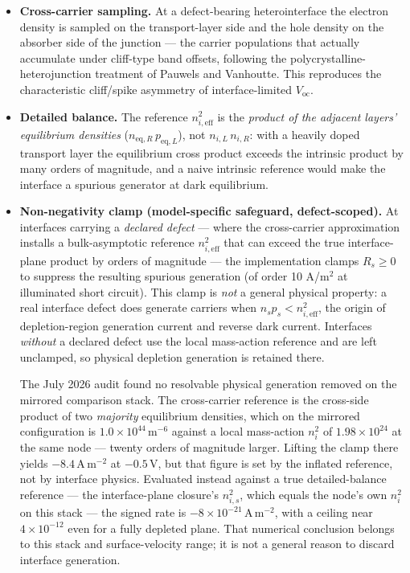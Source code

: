 \documentclass[
  11pt,
  american,
]{report}
\begin{document}
\begin{itemize}
\item
  \textbf{Cross-carrier sampling.} At a defect-bearing heterointerface
  the electron density is sampled on the transport-layer side and the
  hole density on the absorber side of the junction --- the carrier
  populations that actually accumulate under cliff-type band offsets,
  following the polycrystalline-heterojunction treatment of Pauwels and
  Vanhoutte. This reproduces the characteristic cliff/spike asymmetry of
  interface-limited \(V_\mathrm{oc}\).
\item
  \textbf{Detailed balance.} The reference \(n_{i,\mathrm{eff}}^2\) is
  the \emph{product of the adjacent layers' equilibrium densities}
  (\(n_{\mathrm{eq},R}\, p_{\mathrm{eq},L}\)), not
  \(n_{i,L}\, n_{i,R}\): with a heavily doped transport layer the
  equilibrium cross product exceeds the intrinsic product by many orders
  of magnitude, and a naive intrinsic reference would make the interface
  a spurious generator at dark equilibrium.
\item
  \textbf{Non-negativity clamp (model-specific safeguard,
  defect-scoped).} At interfaces carrying a \emph{declared defect} ---
  where the cross-carrier approximation installs a bulk-asymptotic
  reference \(n_{i,\mathrm{eff}}^2\) that can exceed the true
  interface-plane product by orders of magnitude --- the implementation
  clamps \(R_s \geq 0\) to suppress the resulting spurious generation
  (of order 10 A/m\(^2\) at illuminated short circuit). This clamp is
  \emph{not} a general physical property: a real interface defect does
  generate carriers when \(n_s p_s < n_{i,\mathrm{eff}}^2\), the origin
  of depletion-region generation current and reverse dark current.
  Interfaces \emph{without} a declared defect use the local mass-action
  reference and are left unclamped, so physical depletion generation is
  retained there.

  The July 2026 audit found no resolvable physical generation removed on
  the mirrored comparison stack. The cross-carrier reference is the
  cross-side product of two \emph{majority} equilibrium densities, which
  on the mirrored configuration is \(1.0\times10^{44}\,\mathrm{m^{-6}}\)
  against a local mass-action \(n_i^2\) of \(1.98\times10^{24}\) at the
  same node --- twenty orders of magnitude larger. Lifting the clamp
  there yields \(-8.4\,\mathrm{A\,m^{-2}}\) at \(-0.5\,\mathrm{V}\), but
  that figure is set by the inflated reference, not by interface
  physics. Evaluated instead against a true detailed-balance reference
  --- the interface-plane closure's \(n_{i,s}^2\), which equals the
  node's own \(n_i^2\) on this stack --- the signed rate is
  \(-8\times10^{-21}\,\mathrm{A\,m^{-2}}\), with a ceiling near
  \(4\times10^{-12}\) even for a fully depleted plane. That numerical
  conclusion belongs to this stack and surface-velocity range; it is not
  a general reason to discard interface generation.
\end{itemize}
\end{document}
